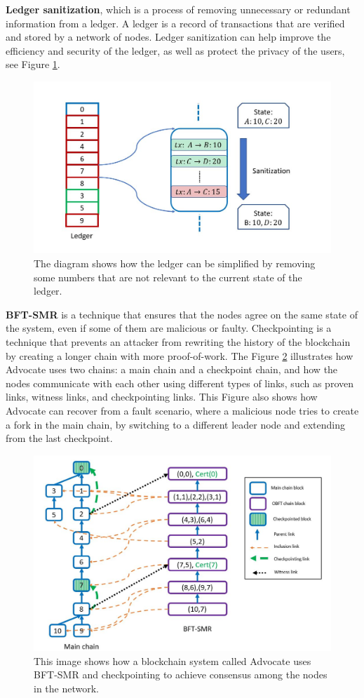 \textbf{Ledger sanitization}, which is a process of removing unnecessary or redundant information from a ledger. A ledger is a record of transactions that are verified and stored by a network of nodes. Ledger sanitization can help improve the efficiency and security of the ledger, as well as protect the privacy of the users, see Figure \ref{fig:L18_f7}.
\begin{figure}[h!]
	\centering
	\includegraphics[width=0.8\linewidth]{Fig/18/F7}
	\caption{The diagram shows how the ledger can be simplified by removing some numbers that are not relevant to the current state of the ledger.}
	\label{fig:L18_f7}
\end{figure}
\textbf{BFT-SMR} is a technique that ensures that the nodes agree on the same state of the system, even if some of them are malicious or faulty. Checkpointing is a technique that prevents an attacker from rewriting the history of the blockchain by creating a longer chain with more proof-of-work. The Figure \ref{fig:L18_f8} illustrates how Advocate uses two chains: a main chain and a checkpoint chain, and how the nodes communicate with each other using different types of links, such as proven links, witness links, and checkpointing links. This Figure also shows how Advocate can recover from a fault scenario, where a malicious node tries to create a fork in the main chain, by switching to a different leader node and extending from the last checkpoint.
\begin{figure}[h!]
	\centering
	\includegraphics[width=0.8\linewidth]{Fig/18/F8}
	\caption{This image shows how a blockchain system called Advocate uses BFT-SMR and checkpointing to achieve consensus among the nodes in the network.}
	\label{fig:L18_f8}
\end{figure}

